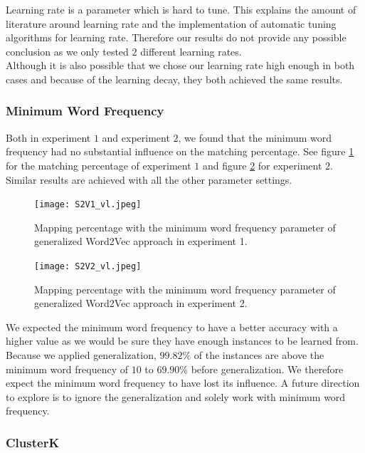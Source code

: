Learning rate is a parameter which is hard to tune. This explains the amount of literature around learning rate and the implementation of automatic tuning algorithms for learning rate. Therefore our results do not provide any possible conclusion as we only tested $2$ different learning rates. \\
Although it is also possible that we chose our learning rate high enough in both cases and because of the learning decay, they both achieved the same results.

\subsubsection*{Minimum Word Frequency}

Both in experiment $1$ and experiment $2$, we found that the minimum word frequency had no substantial influence on the matching percentage. See figure \ref{fig:s2v_vl_1} for the matching percentage of experiment $1$ and figure \ref{fig:s2v_vl_2} for experiment $2$. Similar results are achieved with all the other parameter settings. \\

\begin{figure}[!htb]
	\centering
	\texttt{[image: S2V1\_vl.jpeg]}
	\caption{Mapping percentage with the minimum word frequency parameter of generalized Word2Vec approach in experiment 1.}
	\label{fig:s2v_vl_1}
\end{figure}

\begin{figure}[!htb]
	\centering
	\texttt{[image: S2V2\_vl.jpeg]}
	\caption{Mapping percentage with the minimum word frequency parameter of generalized Word2Vec approach in experiment 2.}
	\label{fig:s2v_vl_2}
\end{figure}

We expected the minimum word frequency to have a better accuracy with a higher value as we would be sure they have enough instances to be learned from. Because we applied generalization, $99.82$\% of the instances are above the minimum word frequency of $10$ to $69.90$\% before generalization. We therefore expect the minimum word frequency to have lost its influence. A future direction to explore is to ignore the generalization and solely work with minimum word frequency.

\subsubsection*{ClusterK}

